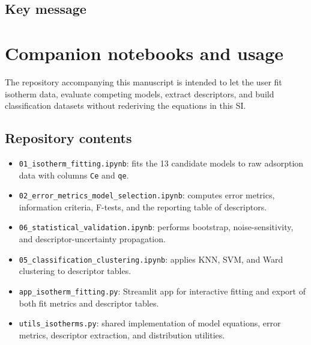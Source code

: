 \documentclass[journal=aamick,manuscript=article]{achemso}
\begin{document}
\subsection{Key message}
\label{sec:si_key_message}

\noindent{}

\section{Companion notebooks and usage}
\label{sec:si_notebooks}

The repository accompanying this manuscript is intended to let the user fit
isotherm data, evaluate competing models, extract descriptors, and build
classification datasets without rederiving the equations in this SI.

\subsection{Repository contents}
\label{sec:si_notebook_contents}

\begin{itemize}
	\item \texttt{01\_isotherm\_fitting.ipynb}: fits the 13 candidate models to
	raw adsorption data with columns \texttt{Ce} and \texttt{qe}.
	\item \texttt{02\_error\_metrics\_model\_selection.ipynb}: computes error
	metrics, information criteria, F-tests, and the reporting table of
	descriptors.
	\item \texttt{06\_statistical\_validation.ipynb}: performs bootstrap,
	noise-sensitivity, and descriptor-uncertainty propagation.
	\item \texttt{05\_classification\_clustering.ipynb}: applies KNN, SVM, and
	Ward clustering to descriptor tables.
	\item \texttt{app\_isotherm\_fitting.py}: Streamlit app for interactive fitting
	and export of both fit metrics and descriptor tables.
	\item \texttt{utils\_isotherms.py}: shared implementation of model equations,
	error metrics, descriptor extraction, and distribution utilities.
\end{itemize}
\end{document}
